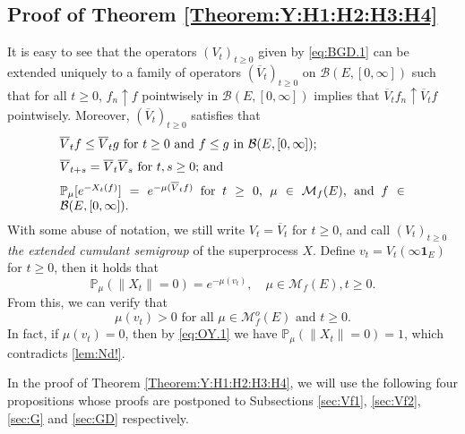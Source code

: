\documentclass[12pt,a4paper]{amsart}
\numberwithin{equation}{section}
\theoremstyle{plain}
\theoremstyle{definition}
\theoremstyle{remark}
\begin{document}
\subsection{Proof of Theorem \ref{Theorem:Y:H1:H2:H3:H4}} \label{subsec:OY}
	It is easy to see that the operators $(V_t)_{t\geq 0}$
	given by \eqref{eq:BGD.1} can be extended uniquely to a family of operators $(\overline V_t)_{t\geq 0}$ on $\mathcal B(E,[0,\infty])$ such that for all $t\geq 0$, $f_n \uparrow f$ pointwisely in  $\mathcal B(E, [0,\infty])$ implies that $\overline V_tf_n \uparrow \overline V_tf$ pointwisely.
	Moreover, $(\overline V_t)_{t\geq 0}$ satisfies that
\begin{equation}
\begin{minipage}{0.8\textwidth}
	$\overline V_t f \leq \overline V_t g$ for $t\geq 0$ and $f\leq g$ in $\mathcal B(E,[0,\infty])$;
\end{minipage}\label{Fact:BV!}
\end{equation}
\begin{equation}
\begin{minipage}{0.8\textwidth}
	$\overline V_{t+s} = \overline V_t \overline V_s$ for $t, s\geq 0$;  and
\end{minipage} \label{eq:OY.0}
\end{equation}
\begin{equation}
\begin{minipage}{0.8\textwidth}
	$\mathbb P_\mu [e^{-X_t(f)}] = e^{- \mu(\overline V_tf)}$ for $t\geq 0$, $\mu \in \mathcal M_f(E)$, and $f\in \mathcal B(E,[0,\infty])$.
\end{minipage} \label{eq:BGD.2}
\end{equation}
	With some abuse of notation, we still write $V_t = \overline V_t$ for $t\geq 0$, and call $(V_t)_{t\geq 0}$ \emph{the extended cumulant semigroup} of the superprocess $X$.
	Define $v_t = V_t(\infty  \mathbf 1_E)$ for $t\geq 0$, then it holds that
\begin{equation} \label{eq:OY.1}
	\mathbb P_\mu (\|X_t\| = 0)
	= e^{- \mu (v_t)},
	\quad \mu \in \mathcal M_f(E), t\geq 0.
\end{equation}
	From this, we can verify that
\begin{equation}\label{lem:sv2!}
	\text{$\mu(v_t) > 0$ for all $\mu \in \mathcal M_f^o(E)$ and $t \geq 0$.}
\end{equation}
	In fact, if $\mu(v_t) = 0$, then by \eqref{eq:OY.1} we have $\mathbb P_\mu(\|X_t \| = 0) = 1$, which contradicts \eqref{lem:Nd!}.

	In the  proof of Theorem \ref{Theorem:Y:H1:H2:H3:H4}, we will use the following four propositions whose proofs are postponed to Subsections \ref{sec:Vf1}, \ref{sec:Vf2}, \ref{sec:G} and \ref{sec:GD} respectively.
\end{document}
